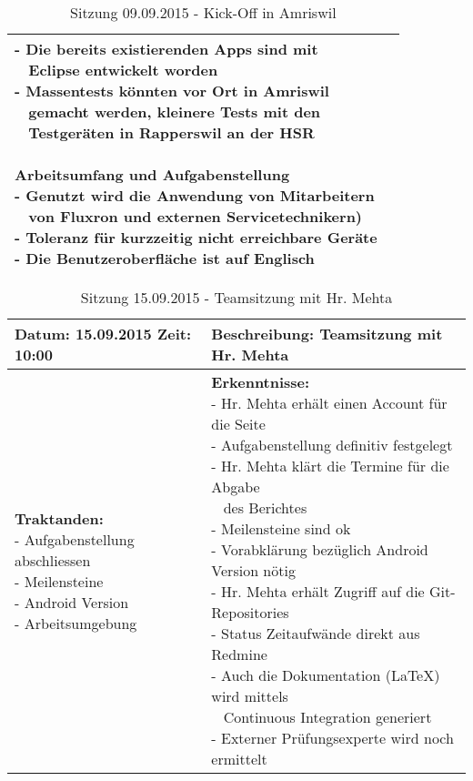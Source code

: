 \begin{table}[H]
\begin{tabularx}{\textwidth}{| l | X |}
{- Die bereits existierenden Apps sind mit\\~ Eclipse entwickelt worden\\
- Massentests könnten vor Ort in Amriswil\\~ gemacht werden, kleinere Tests mit den\\~ Testgeräten in Rapperswil an der HSR\\
\\
\textbf{Arbeitsumfang und Aufgabenstellung}\\
- Genutzt wird die Anwendung von Mitarbeitern\\~ von Fluxron und externen Servicetechnikern)\\
- Toleranz für kurzzeitig nicht erreichbare Geräte\\
- Die Benutzeroberfläche ist auf Englisch\\
}
\\ \hline
\end{tabularx}
\caption{Sitzung 09.09.2015 - Kick-Off in Amriswil}
\end{table}



\begin{table}[H]
\begin{tabularx}{\textwidth}{| l | X |}
\hline
\textbf{Datum:} 15.09.2015
\textbf{Zeit:} 10:00
&
\textbf{Beschreibung:} Teamsitzung mit Hr. Mehta \\ \hline
\specialcell[t]{
\textbf{Traktanden:}\\
- Aufgabenstellung abschliessen\\
- Meilensteine\\
- Android Version\\
- Arbeitsumgebung\\
}
& 
\specialcell[t]{
\textbf{Erkenntnisse:}\\
- Hr. Mehta erhält einen Account für die Seite\\
- Aufgabenstellung definitiv festgelegt\\
- Hr. Mehta klärt die Termine für die Abgabe\\~ des Berichtes\\
- Meilensteine sind ok\\
- Vorabklärung bezüglich Android Version nötig\\
- Hr. Mehta erhält Zugriff auf die Git-Repositories\\
- Status Zeitaufwände direkt aus Redmine\\
- Auch die Dokumentation (\LaTeX) wird mittels\\~ Continuous Integration generiert\\
- Externer Prüfungsexperte wird noch ermittelt\\
}
\\ \hline
\end{tabularx}
\caption{Sitzung 15.09.2015 - Teamsitzung mit Hr. Mehta}
\end{table}



